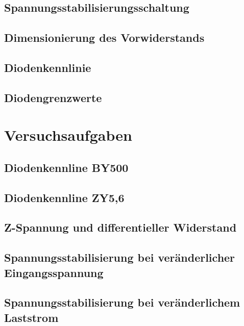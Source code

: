 \documentclass[a4paper, 12pt]{article}
\begin{document}
\subsection{Spannungsstabilisierungsschaltung}

\subsection{Dimensionierung des Vorwiderstands}

\subsection{Diodenkennlinie}

\subsection{Diodengrenzwerte}


\section{Versuchsaufgaben}

\subsection{Diodenkennline BY500}

\subsection{Diodenkennline ZY5,6}

\subsection{Z-Spannung und differentieller Widerstand}

\subsection{Spannungsstabilisierung bei veränderlicher Eingangsspannung}

\subsection{Spannungsstabilisierung bei veränderlichem Laststrom}
\end{document}
